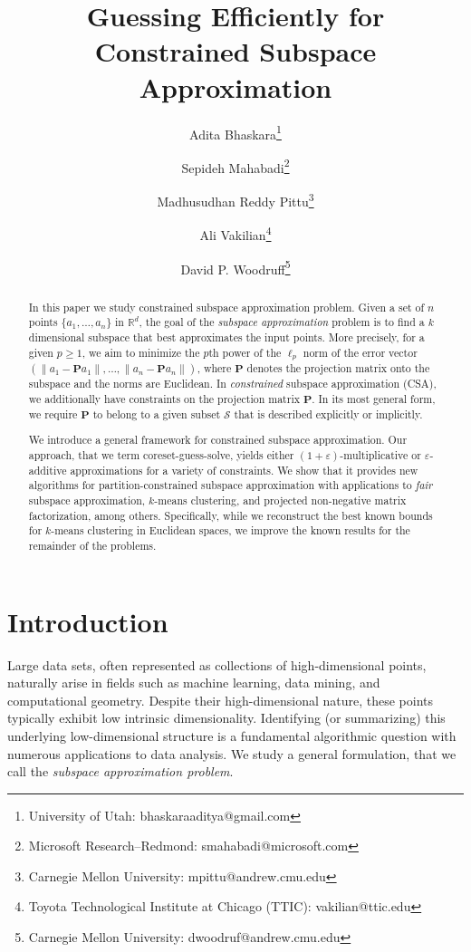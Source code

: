\documentclass[11pt]{article}
\title{Guessing Efficiently for Constrained Subspace Approximation}
\date{}
\author{
  Adita Bhaskara\thanks{University of Utah: bhaskaraaditya@gmail.com}
  \and Sepideh Mahabadi\thanks{Microsoft Research--Redmond: smahabadi@microsoft.com}
  \and Madhusudhan Reddy Pittu\thanks{Carnegie Mellon University: mpittu@andrew.cmu.edu}
  \and Ali Vakilian\thanks{Toyota Technological Institute at Chicago (TTIC): vakilian@ttic.edu}
  \and David P. Woodruff\thanks{Carnegie Mellon University: dwoodruf@andrew.cmu.edu}
}
\theoremstyle{plain}
\theoremstyle{plain}
\theoremstyle{definition}
\theoremstyle{plain}
\theoremstyle{remark}
\begin{document}
\maketitle

\begin{abstract}
In this paper we study constrained subspace approximation problem. Given a set of $n$ points $\{a_1,\ldots,a_n\}$ in $\mathbb{R}^d$, the goal of the {\em subspace approximation} problem is to find a $k$ dimensional subspace that best approximates the input points. More precisely, for a given $p\geq 1$, we aim to minimize the $p$th power of the $\ell_p$ norm of the error vector $(\|a_1-\bm{P}a_1\|,\ldots,\|a_n-\bm{P}a_n\|)$, where $\bm{P}$ denotes the projection matrix onto the subspace and the norms are Euclidean.
In \emph{constrained} subspace approximation (CSA), we additionally have constraints on the projection matrix $\bm{P}$. In its most general form, we require $\bm{P}$ to belong to a given subset $\mathcal{S}$ that is described explicitly or implicitly.

We introduce a general framework for constrained subspace approximation. Our approach, that we term coreset-guess-solve, yields either $(1+\varepsilon)$-multiplicative or $\varepsilon$-additive approximations for a variety of constraints. We show that it provides new algorithms for partition-constrained subspace approximation with applications to {\it fair} subspace approximation, $k$-means clustering, and projected non-negative matrix factorization, among others. Specifically, while we reconstruct the best known bounds for $k$-means clustering in Euclidean spaces, we improve the known results for the remainder of the problems. 
\end{abstract}



\section{Introduction}\label{sec:intro}

Large data sets, often represented as collections of high-dimensional points, naturally arise in fields such as machine learning, data mining, and computational geometry. Despite their high-dimensional nature, these points typically exhibit low intrinsic dimensionality. Identifying (or summarizing) this underlying low-dimensional structure is a fundamental algorithmic question with numerous applications to data analysis. We study a general formulation, that we call the  {\em subspace approximation problem}. 
\end{document}
